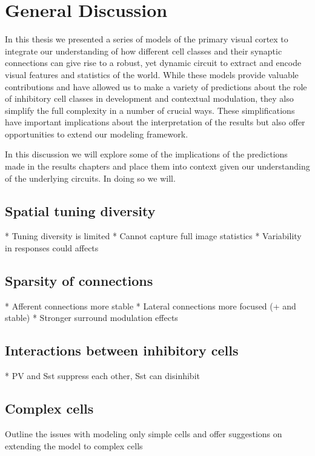 \chapter{General Discussion}

In this thesis we presented a series of models of the primary visual
cortex to integrate our understanding of how different cell classes
and their synaptic connections can give rise to a robust, yet dynamic
circuit to extract and encode visual features and statistics of the
world. While these models provide valuable contributions and have
allowed us to make a variety of predictions about the role of
inhibitory cell classes in development and contextual modulation, they
also simplify the full complexity in a number of crucial ways. These
simplifications have important implications about the interpretation
of the results but also offer opportunities to extend our modeling
framework.

In this discussion we will explore some of the implications of the
predictions made in the results chapters and place them into context
given our understanding of the underlying circuits. In doing so we
will.


\section{Spatial tuning diversity}

* Tuning diversity is limited
* Cannot capture full image statistics
* Variability in responses could affects

\section{Sparsity of connections}

* Afferent connections more stable
* Lateral connections more focused (+ and stable)
* Stronger surround modulation effects

\section{Interactions between inhibitory cells}

* PV and Sst suppress each other, Sst can disinhibit

\section{Complex cells}

Outline the issues with modeling only simple cells and offer
suggestions on extending the model to complex cells

